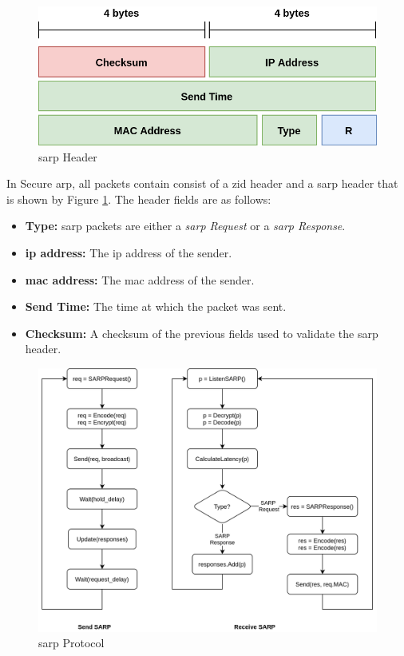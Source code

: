 \begin{figure}[!htb]
    \centering
    \includegraphics[width=0.8\linewidth]{images/sarp_header.png}
    \caption{\acrshort{sarp} Header}
    \label{fig:sarp-header}
\end{figure}
In Secure \acrshort{arp}, all packets contain consist of a \acrshort{zid} header and a \acrshort{sarp} header that is shown by Figure \ref{fig:sarp-header}. The header fields are as follows:
\begin{itemize}[itemsep=1pt, topsep=5pt]
    \item \textbf{Type:} \acrshort{sarp} packets are either a \textit{\acrshort{sarp} Request} or a \textit{\acrshort{sarp} Response}.
    \item \textbf{\acrshort{ip} address:} The \acrshort{ip} address of the sender.
    \item \textbf{\acrshort{mac} address:} The \acrshort{mac} address of the sender.
    \item \textbf{Send Time:} The time at which the packet was sent.
    \item \textbf{Checksum:} A checksum of the previous fields used to validate the \acrshort{sarp} header.
\end{itemize}

\begin{figure}[!htb]
    \centering
    \includegraphics[width=\linewidth]{images/sarp_flowchart.png}
    \caption{\acrshort{sarp} Protocol}
    \label{fig:sarp-flowchart}
\end{figure}

